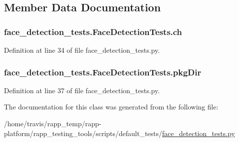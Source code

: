 \subsection{Member Data Documentation}
\hypertarget{classface__detection__tests_1_1FaceDetectionTests_a5e113303f4649f34aef55c80e67b92f3}{
\subsubsection[{ch}]{\setlength{\rightskip}{0pt plus 5cm}face\-\_\-detection\-\_\-tests.\-Face\-Detection\-Tests.\-ch}}\label{classface__detection__tests_1_1FaceDetectionTests_a5e113303f4649f34aef55c80e67b92f3}


Definition at line 34 of file face\-\_\-detection\-\_\-tests.\-py.

\hypertarget{classface__detection__tests_1_1FaceDetectionTests_af669feda8639f620ec79aa5793fc46e7}{
\subsubsection[{pkg\-Dir}]{\setlength{\rightskip}{0pt plus 5cm}face\-\_\-detection\-\_\-tests.\-Face\-Detection\-Tests.\-pkg\-Dir}}\label{classface__detection__tests_1_1FaceDetectionTests_af669feda8639f620ec79aa5793fc46e7}


Definition at line 37 of file face\-\_\-detection\-\_\-tests.\-py.



The documentation for this class was generated from the following file\-:\begin{DoxyCompactItemize}
\item 
/home/travis/rapp\-\_\-temp/rapp-\/platform/rapp\-\_\-testing\-\_\-tools/scripts/default\-\_\-tests/\hyperlink{face__detection__tests_8py}{face\-\_\-detection\-\_\-tests.\-py}\end{DoxyCompactItemize}

